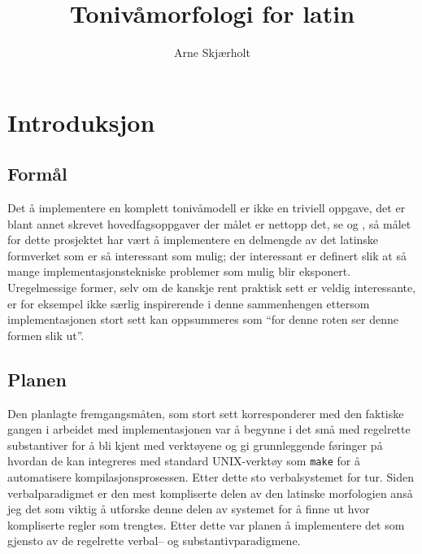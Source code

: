 \documentclass{article}
\title{Toniv\aa{}morfologi for latin}
\author{Arne Skj\ae{}rholt}
\begin{document}
\maketitle
\tableofcontents

\section{Introduksjon}
\subsection{Form\aa{}l}
Det \aa{} implementere en komplett toniv\aa{}modell er ikke en triviell
oppgave, det er blant annet skrevet hovedfagsoppgaver der m\aa{}let er nettopp
det, se \cite{bondihoved} og \cite{french}, s\aa{} m\aa{}let for dette
prosjektet har v\ae{}rt \aa{} implementere en delmengde av det latinske
formverket som er s\aa{} interessant som mulig; der interessant er definert
slik at s\aa{} mange implementasjonstekniske problemer som mulig blir
eksponert. Uregelmessige former, selv om de kanskje rent praktisk sett er
veldig interessante, er for eksempel ikke s\ae{}rlig inspirerende i denne
sammenhengen ettersom implementasjonen stort sett kan oppsummeres som ``for
denne roten ser denne formen slik ut''.

\subsection{Planen}
Den planlagte fremgangsm\aa{}ten, som stort sett korresponderer med den
faktiske gangen i arbeidet med implementasjonen var \aa{} begynne i det
sm\aa{} med regelrette substantiver for \aa{} bli kjent med verkt\o{}yene og
gi grunnleggende f\o{}ringer p\aa{} hvordan de kan integreres med standard
UNIX-verkt\o{}y som \texttt{make} for \aa{} automatisere
kompilasjonsprosessen. Etter dette sto verbalsystemet for tur. Siden
verbalparadigmet er den mest kompliserte delen av den latinske morfologien
ans\aa{} jeg det som viktig \aa{} utforske denne delen av systemet for \aa{}
finne ut hvor kompliserte regler som trengtes. Etter dette var planen \aa{}
implementere det som gjensto av de regelrette verbal-- og
substantivparadigmene.

\end{document}
